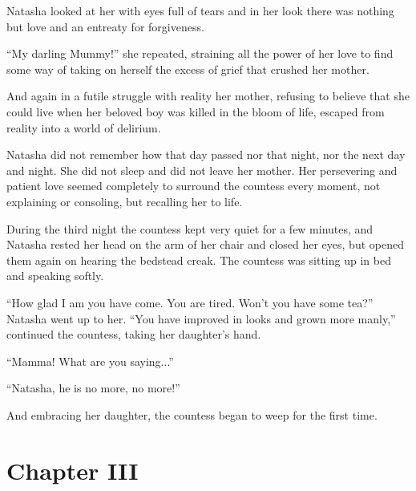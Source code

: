 Natasha looked at her with eyes full of tears and in her look
there was nothing but love and an entreaty for forgiveness.

``My darling Mummy!'' she repeated, straining all the power of
her love to find some way of taking on herself the excess of
grief that crushed her mother.

And again in a futile struggle with reality her mother, refusing
to believe that she could live when her beloved boy was killed in
the bloom of life, escaped from reality into a world of delirium.

Natasha did not remember how that day passed nor that night, nor
the next day and night. She did not sleep and did not leave her
mother. Her persevering and patient love seemed completely to
surround the countess every moment, not explaining or consoling,
but recalling her to life.

During the third night the countess kept very quiet for a few
minutes, and Natasha rested her head on the arm of her chair and
closed her eyes, but opened them again on hearing the bedstead
creak. The countess was sitting up in bed and speaking softly.

``How glad I am you have come. You are tired. Won't you have some
tea?''  Natasha went up to her. ``You have improved in looks and
grown more manly,'' continued the countess, taking her daughter's
hand.

``Mamma! What are you saying...''

``Natasha, he is no more, no more!''

And embracing her daughter, the countess began to weep for the
first time.


\chapter*{Chapter III}
\ifaudio 
{}
\fi

